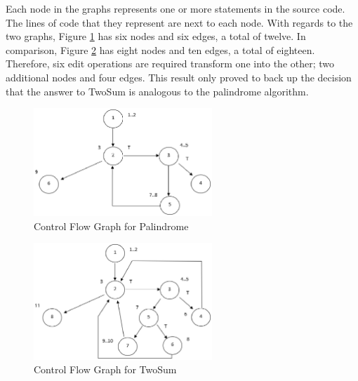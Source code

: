 \documentclass[conference]{IEEEtran}
\begin{document}
 \par Each node in the graphs represents one or more statements in the source code. The lines of code that they represent are next to each node. With regards to the two graphs, Figure \ref{fig:cfgpal} has six nodes and six edges, a total of twelve. In comparison, Figure \ref{fig:cfgtwosum} has eight nodes and ten edges, a total of eighteen. Therefore, six edit operations are required transform one into the other; two additional nodes and four edges. This result only proved to back up the decision that the answer to TwoSum is analogous to the palindrome algorithm.
 \begin{figure}[h]
\includegraphics[width=0.6\textwidth]{CFGPalindrome}
\caption{Control Flow Graph for Palindrome}
\label{fig:cfgpal}
\end{figure}
 \begin{figure}[h]
\includegraphics[width=0.6\textwidth]{CFGTwoSum}
\caption{Control Flow Graph for TwoSum}
\label{fig:cfgtwosum}
\end{figure}
\end{document}
